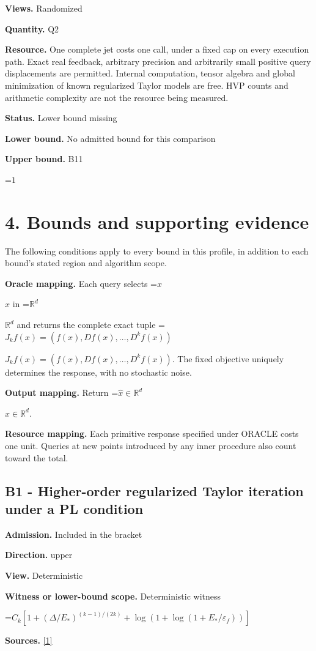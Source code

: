 \documentclass[10pt,a4paper]{article}
\newcommand{\AtlasMath}[1]{\par\begingroup\centering\setbox0=\hbox{$\displaystyle #1$}\ifdim\wd0>1.4\linewidth\typeout{ATLAS WIDE FORMULA: \the\wd0}\fi\ifdim\wd0>\linewidth\resizebox{\linewidth}{!}{\box0}\else\box0\fi\par\endgroup}
\newcommand{\AtlasInlineMath}[1]{\begingroup\setbox0=\hbox{$#1$}\ifdim\wd0>.4\linewidth\endgroup\AtlasMath{#1}\else\endgroup$#1$\fi}
\begin{document}
\textbf{Views.} Randomized

\textbf{Quantity.} Q2

\textbf{Resource.} One complete jet costs one call, under a fixed cap on every execution path. Exact real feedback, arbitrary precision and arbitrarily small positive query displacements are permitted. Internal computation, tensor algebra and global minimization of known regularized Taylor models are free. HVP counts and arithmetic complexity are not the resource being measured.

\textbf{Status.} Lower bound missing

\textbf{Lower bound.} No admitted bound for this comparison

\textbf{Upper bound.} B11

\AtlasMath{1}
\section{4. Bounds and supporting evidence}
The following conditions apply to every bound in this profile, in addition to each bound's stated region and algorithm scope.

\textbf{Oracle mapping.} Each query selects \AtlasInlineMath{x} in \AtlasInlineMath{\mathbb{R}^d} and returns the complete exact tuple \AtlasInlineMath{J_{k}f(x)=(f(x),Df(x),\ldots,D^{k}f(x))}. The fixed objective uniquely determines the response, with no stochastic noise.

\textbf{Output mapping.} Return \AtlasInlineMath{\widehat{x}\in \mathbb{R}^d}.

\textbf{Resource mapping.} Each primitive response specified under ORACLE costs one unit. Queries at new points introduced by any inner procedure also count toward the total.

\subsection{B1 - Higher-order regularized Taylor iteration under a PL condition}
\textbf{Admission.} Included in the bracket

\textbf{Direction.} upper

\textbf{View.} Deterministic

\textbf{Witness or lower-bound scope.} Deterministic witness

\AtlasMath{C_k[1+(\Delta/E_*)^{(k-1)/(2k)}+\log(1+\log(1+E_*/\varepsilon_f))]}
\textbf{Sources.} \href{https://optimization-online.org/wp-content/uploads/2015/06/4970.pdf}{[1]}
\end{document}

